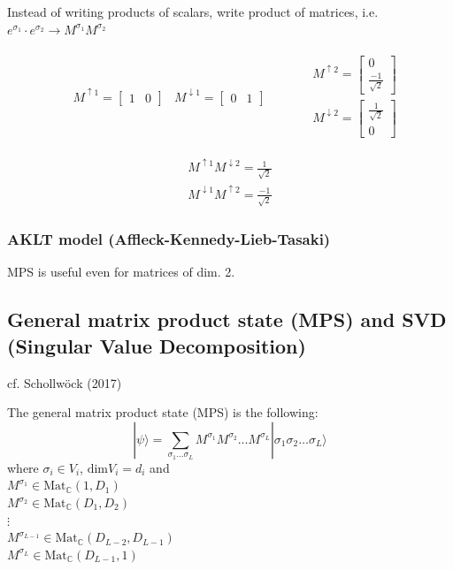 Instead of writing products of scalars, write product of matrices, i.e. $e^{\sigma_1} \cdot e^{\sigma_2} \to M^{\sigma_1} M^{\sigma_2}$

\[
\begin{gathered}
\begin{aligned}
	& M^{\uparrow 1} = \left[ \begin{matrix} 1 & 0 \end{matrix} \right]
	& M^{\downarrow 1} = \left[ \begin{matrix} 0 & 1 \end{matrix} \right] 
	\end{aligned} \quad \quad \, \begin{aligned}
	& M^{\uparrow 2 } = \left[ \begin{matrix} 0 \\ \frac{-1}{\sqrt{2}} \end{matrix} \right] \\
	& M^{\downarrow 2} = \left[ \begin{matrix} \frac{1}{\sqrt{2}} \\ 0 \end{matrix} \right] 
	\end{aligned}
\end{gathered}
\]

\[
\begin{gathered}
M^{\uparrow 1} M^{\downarrow 2} = \frac{1}{\sqrt{2}} \\ 
M^{\downarrow 1} M^{\uparrow 2} = \frac{-1}{\sqrt{2}} 
\end{gathered}
\]

\subsubsection{AKLT model (Affleck-Kennedy-Lieb-Tasaki)}

MPS is useful even for matrices of dim. 2.


\subsection{General matrix product state (MPS) and SVD (Singular Value Decomposition)}

cf. Schollw\"{o}ck (2017) \cite{agat:ArSo2017}

The general matrix product state (MPS) is the following:
\begin{equation}
|\psi \rangle = \sum_{ \sigma_1 \dots \sigma_L } M^{\sigma_1} M^{\sigma_2} \dots M^{\sigma_L} | \sigma_1 \sigma_2 \dots \sigma_L \rangle
\end{equation}
where $\sigma_i \in V_i$, $\text{dim}V_i = d_i$ and \\
$M^{\sigma_1} \in \text{Mat}_{\mathbb{C}}(1, D_1)$ \\ 
$M^{\sigma_2} \in \text{Mat}_{\mathbb{C}}(D_1, D_2)$ \\ 
$\vdots$ \\ 
$M^{\sigma_{L-1}} \in \text{Mat}_{\mathbb{C}}(D_{L-2}, D_{L-1})$ \\ 
$M^{\sigma_L} \in \text{Mat}_{\mathbb{C}}(D_{L-1}, 1)$ \\ 

